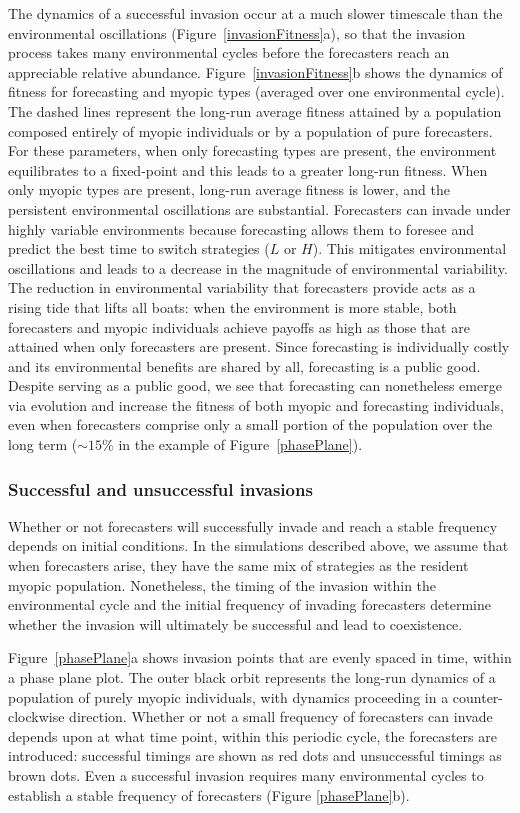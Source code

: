 \documentclass{article}
\begin{document}
The dynamics of a successful invasion occur at a much slower timescale than the environmental oscillations (Figure~\ref{invasionFitness}a), so that the invasion process takes many environmental cycles before the forecasters reach an appreciable relative abundance. Figure~\ref{invasionFitness}b shows the dynamics of fitness for forecasting and myopic types (averaged over one environmental cycle). The dashed lines represent the long-run average fitness attained by a population composed entirely of myopic individuals or by a population of pure forecasters. For these parameters, when only forecasting types are present, the environment equilibrates to a fixed-point and this leads to a greater long-run fitness. When only myopic types are present, long-run average fitness is lower, and the persistent environmental oscillations are substantial. Forecasters can invade under highly variable environments because forecasting allows them to foresee and predict the best time to switch strategies ($L$ or $H$). This mitigates environmental oscillations and leads to a decrease in the magnitude of environmental variability. The reduction in environmental variability that forecasters provide acts as a rising tide that lifts all boats: when the environment is more stable, both forecasters and myopic individuals achieve payoffs as high as those that are attained when only forecasters are present. Since forecasting is individually costly and its environmental benefits are shared by all, forecasting is a public good.
Despite serving as a public good, we see that forecasting can nonetheless emerge via evolution and increase the fitness of both myopic and forecasting individuals, even when forecasters comprise only a small portion of the population over the long term ($\sim15\%$ in the example of Figure~\ref{phasePlane}).  

\subsubsection*{Successful and unsuccessful invasions}
Whether or not forecasters will successfully invade and reach a stable frequency depends on initial conditions. In the simulations described above, we assume that when forecasters arise, they have the same mix of strategies as the resident myopic population. Nonetheless, the timing of the invasion within the environmental cycle and the initial frequency of invading forecasters determine whether the invasion will ultimately be successful and lead to coexistence.  

Figure~\ref{phasePlane}a shows invasion points that are evenly spaced in time, within a phase plane plot. The outer black orbit represents the long-run dynamics of a population of purely myopic individuals,  with dynamics proceeding in a counter-clockwise direction. Whether or not a small frequency of forecasters can invade depends upon at what time point, within this periodic cycle, the forecasters are introduced: successful timings are shown as red dots and unsuccessful timings as brown dots. Even a successful invasion requires many environmental cycles to establish a stable frequency of forecasters (Figure \ref{phasePlane}b).
\end{document}
